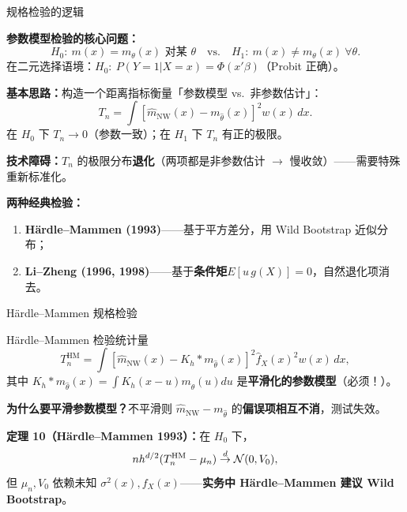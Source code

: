 \documentclass[aspectratio=169, 10pt]{beamer}
\begin{document}
\begin{frame}{规格检验的逻辑}

  \textbf{参数模型检验的核心问题：}
  \[
    H_0: \ m(x) = m_\theta(x) \text{ 对某 }\theta \quad\text{vs.}\quad
    H_1: \ m(x) \neq m_\theta(x)\ \forall \theta.
  \]
  在二元选择语境：$H_0:\ P(Y=1|X=x) = \Phi(x'\beta)$（Probit 正确）。

  \begin{keybox}
    \textbf{基本思路：}构造一个距离指标衡量「参数模型 vs.\ 非参数估计」：
    \[
      T_n = \int [\hat m_{\text{NW}}(x) - m_{\hat\theta}(x)]^2 w(x)\, dx.
    \]
    在 $H_0$ 下 $T_n \to 0$（参数一致）；在 $H_1$ 下 $T_n$ 有正的极限。
  \end{keybox}

  \vspace{0.3em}

  \textbf{技术障碍：}$T_n$ 的极限分布\textbf{退化}（两项都是非参数估计 $\to$ 慢收敛）——需要特殊重新标准化。

  \textbf{两种经典检验：}
  \begin{enumerate}
    \item \textbf{Härdle--Mammen (1993)}——基于平方差分，用 Wild Bootstrap 近似分布；
    \item \textbf{Li--Zheng (1996, 1998)}——基于\textbf{条件矩}$E[u\, g(X)]=0$，自然退化项消去。
  \end{enumerate}

\end{frame}


\begin{frame}{Härdle--Mammen 规格检验}

  \begin{definitionbox}{Härdle--Mammen 检验统计量}
    \[
      T_n^{\text{HM}} = \int \left[\hat m_{\text{NW}}(x) - K_h * m_{\hat\theta}(x)\right]^2 \hat f_X(x)^2 w(x)\, dx,
    \]
    其中 $K_h * m_{\hat\theta}(x) = \int K_h(x-u) m_{\hat\theta}(u) du$ 是\textbf{平滑化的参数模型}（必须！）。
  \end{definitionbox}

  \textbf{为什么要平滑参数模型？}不平滑则 $\hat m_{\text{NW}} - m_{\hat\theta}$ 的\textbf{偏误项相互不消}，测试失效。

  \begin{highlightbox}
    \textbf{定理 10（Härdle--Mammen 1993）：}在 $H_0$ 下，
    \[
      nh^{d/2}(T_n^{\text{HM}} - \mu_n) \overset{d}{\to} \mathcal{N}(0, V_0),
    \]
    但 $\mu_n, V_0$ 依赖未知 $\sigma^2(x), f_X(x)$——\textbf{实务中 Härdle--Mammen 建议 Wild Bootstrap}。
  \end{highlightbox}

  \hypertarget{main-b12}{}\hfill{\scriptsize\hyperlink{proof-b12}{}}

\end{frame}
\end{document}
